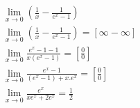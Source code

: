 \begin{ex}
\begin{align}
&\lim_{x\rightarrow 0} \left(\frac{1}{x}-\frac{1}{e^{x}-1}\right)\nonumber\\
&\lim_{x\rightarrow 0} \left(\frac{1}{x}-\frac{1}{e^{x}-1}\right)=[\infty-\infty]\nonumber\\
&\lim_{x\rightarrow 0} \frac{e^{x}-1-1}{x(e^{x}-1)}=\left[\frac{0}{0}\right]\nonumber\\
&\lim_{x\rightarrow 0} \frac{e^{x}-1}{(e^{x}-1)+x.e^{x}}=\left[\frac{0}{0}\right]\nonumber\\
&\lim_{x\rightarrow 0} \frac{e^{x}}{xe^{x}+2e^{x}}=\frac{1}{2}\nonumber
\end{align}
\end{ex}